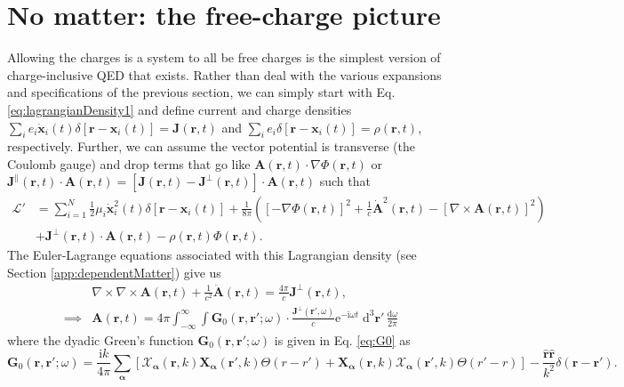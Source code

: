 
\section{No matter: the free-charge picture}\label{app:noMatter}

Allowing the charges is a system to all be free charges is the simplest version of charge-inclusive QED that exists. Rather than deal with the various expansions and specifications of the previous section, we can simply start with Eq. \eqref{eq:lagrangianDensity1} and define current and charge densities $\sum_ie_i\dot{\mathbf{x}}_i(t)\delta[\mathbf{r} - \mathbf{x}_i(t)] = \mathbf{J}(\mathbf{r},t)$ and $\sum_ie_i\delta[\mathbf{r} - \mathbf{x}_i(t)] = \rho(\mathbf{r},t)$, respectively. Further, we can assume the vector potential is transverse (the Coulomb gauge) and drop terms that go like $\mathbf{A}(\mathbf{r},t)\cdot\nabla\Phi(\mathbf{r},t)$ or $\mathbf{J}^\parallel(\mathbf{r},t)\cdot\mathbf{A}(\mathbf{r},t) = [\mathbf{J}(\mathbf{r},t) - \mathbf{J}^\perp(\mathbf{r},t)]\cdot\mathbf{A}(\mathbf{r},t)$ such that
\begin{equation}
\begin{split}
\mathcal{L}' &= \sum_{i = 1}^N\frac{1}{2}\mu_i\dot{\mathbf{x}}_i^2(t)\delta[\mathbf{r} - \mathbf{x}_i(t)] + \frac{1}{8\pi}\left(\left[-\nabla\Phi(\mathbf{r},t)\right]^2 + \frac{1}{c}\dot{\mathbf{A}}^2(\mathbf{r},t) - \left[\nabla\times\mathbf{A}(\mathbf{r},t)\right]^2\right)\\
&+ \mathbf{J}^\perp(\mathbf{r},t)\cdot\mathbf{A}(\mathbf{r},t) - \rho(\mathbf{r},t)\Phi(\mathbf{r},t).
\end{split}
\end{equation}
The Euler-Lagrange equations associated with this Lagrangian density (see Section \ref{app:dependentMatter}) give us
\begin{equation}
\begin{split}
&\nabla\times\nabla\times\mathbf{A}(\mathbf{r},t) + \frac{1}{c^2}\ddot{\mathbf{A}}(\mathbf{r},t) = \frac{4\pi}{c}\mathbf{J}^\perp(\mathbf{r},t),\\
\implies &\mathbf{A}(\mathbf{r},t) = 4\pi\int_{-\infty}^{\infty}\int\mathbf{G}_0(\mathbf{r},\mathbf{r}';\omega)\cdot\frac{\mathbf{J}^\perp(\mathbf{r}',\omega)}{c}\mathrm{e}^{-\mathrm{i}\omega t}\;\mathrm{d}^3\mathbf{r}'\,\frac{\mathrm{d}\omega}{2\pi}
\end{split}
\end{equation}
where the dyadic Green's function $\mathbf{G}_0(\mathbf{r},\mathbf{r}';\omega)$ is given in Eq. \eqref{eq:G0} as
\begin{equation}
\mathbf{G}_0(\mathbf{r},\mathbf{r}';\omega) = \frac{\mathrm{i}k}{4\pi}\sum_{\bm{\alpha}}\left[\bm{\mathcal{X}}_{\bm{\alpha}}(\mathbf{r},k)\mathbf{X}_{\bm{\alpha}}(\mathbf{r}',k)\Theta(r - r') + \mathbf{X}_{\bm{\alpha}}(\mathbf{r},k)\bm{\mathcal{X}}_{\bm{\alpha}}(\mathbf{r}',k)\Theta(r' - r)\right] - \frac{\hat{\mathbf{r}}\hat{\mathbf{r}}}{k^2}\delta(\mathbf{r} - \mathbf{r}').
\end{equation}

